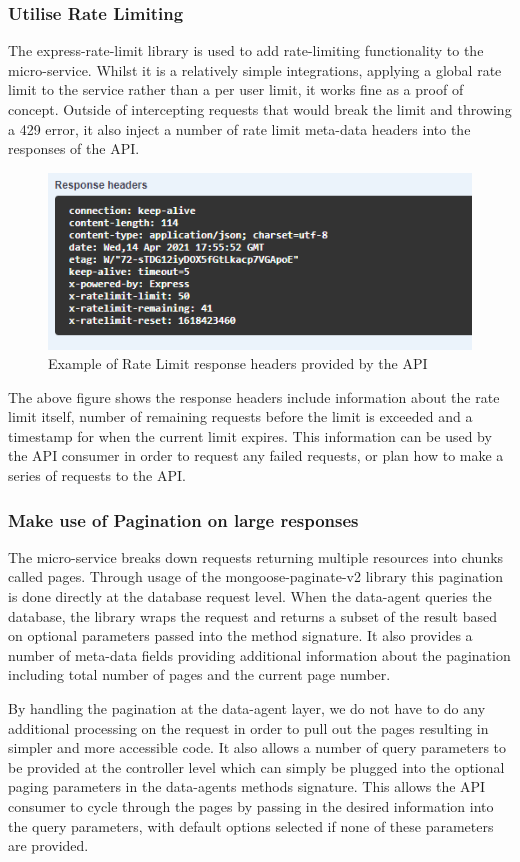 \subsubsection{Utilise Rate Limiting}
The express-rate-limit library is used to add rate-limiting functionality to the micro-service. Whilst it is a relatively simple integrations, applying a global rate limit to the service rather than a per user limit, it works fine as a proof of concept. Outside of intercepting requests that would break the limit and throwing a 429 error, it also inject a number of rate limit meta-data headers into the responses of the API.
\begin{figure}[!htb]
    \caption{Example of Rate Limit response headers provided by the API}
\centering
\includegraphics[scale=0.6]{FYP_Dissertation_template/Figures/rate-limit.PNG}
\end{figure}
\FloatBarrier
The above figure shows the response headers include information about the rate limit itself, number of remaining requests before the limit is exceeded and a timestamp for when the current limit expires. This information can be used by the API consumer in order to request any failed requests, or plan how to make a series of requests to the API.
\subsubsection{Make use of Pagination on large responses}
The micro-service breaks down requests returning multiple resources into chunks called pages. Through usage of the mongoose-paginate-v2 library this pagination is done directly at the database request level. When the data-agent queries the database, the library wraps the request and returns a subset of the result based on optional parameters passed into the method signature. It also provides a number of meta-data fields providing additional information about the pagination including total number of pages and the current page number.

By handling the pagination at the data-agent layer, we do not have to do any additional processing on the request in order to pull out the pages resulting in simpler and more accessible code. It also allows a number of query parameters to be provided at the controller level which can simply be plugged into the optional paging parameters in the data-agents methods signature. This allows the API consumer to cycle through the pages by passing in the desired information into the query parameters, with default options selected if none of these parameters are provided.


